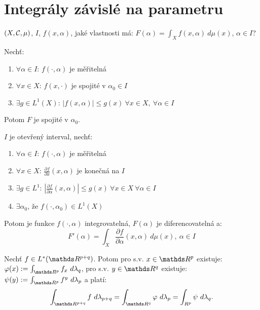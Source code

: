 \documentclass[12pt,a4paper]{article}
\begin{document}
\section{Integrály závislé na parametru}
$(X, \mathcal{ C }, \mu)$, $I$, $f(x,\alpha)$, jaké vlastnosti má: $F(\alpha) = \int_X f(x,\alpha)~d\mu(x)$, $\alpha \in I$?

	Nechť:
	\begin{enumerate}
		\item $\forall \alpha \in I$: $f(\cdot, \alpha)$ je měřitelná
		\item $\forall x \in X$: $f(x, \cdot)$ je spojité v $\alpha_0 \in I$
		\item $\exists g \in L^1(X)$: $|f(x, \alpha)| \leq g(x)~\forall x \in X,~\forall \alpha \in I$
	\end{enumerate}

	Potom $F$ je spojité v $\alpha_0$.

 $I$ je otevřený interval, nechť:
	\begin{enumerate}
		\item $\forall \alpha \in I$: $f(\cdot, \alpha)$ je měřitelná
		\item $\forall x \in X$: $\frac{\partial f}{\partial x}(x,\alpha)$ je konečná na $I$
		\item $\exists g \in L^1$: $|\frac{\partial f}{\partial \alpha}(x,\alpha)| \leq g(x)~\forall x \in X~\forall \alpha \in I$
		\item $\exists \alpha_0$, že $f(\cdot, \alpha_0) \in L^1(X)$
	\end{enumerate}

	Potom je funkce $f(\cdot,\alpha)$ integrovatelná, $F(\alpha)$ je diferencovatelná a:
		$$F'(\alpha) = \int_X \frac{\partial f}{\partial \alpha}(x,\alpha)~d\mu(x),~\alpha \in I$$

\veta[Fubini]
	Nechť $f \in L^*(\R^{p+q})$. Potom pro s.v. $x \in \R^p$ existuje: $\varphi(x) := \int_{\R^p} f_x~d\lambda_q$,
	pro s.v. $y \in \R^q$ existuje: $\psi(y) := \int_{\R^p} f^y~d\lambda_p$ a platí:
		$$\int_{\R^{p+q}} f~d\lambda_{p+q} = \int_{\R^q} \varphi~d\lambda_p = \int_{R^p} \psi~d\lambda_q.$$
\end{document}
